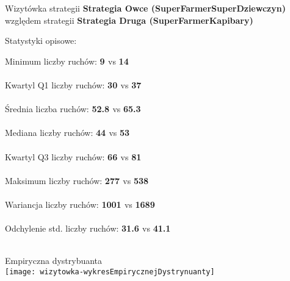 \documentclass{article}
\begin{document}
\thispagestyle{empty}

\begin{center}
{\large Wizytówka strategii {\color[HTML]{1D77A8} \textbf{ Strategia Owce (SuperFarmerSuperDziewczyn) }} względem strategii {\color[HTML]{999999} \textbf{ Strategia Druga (SuperFarmerKapibary) }}}\end{center}
\vspace*{3mm}
\begin{multicols}{3}

\begin{center}
{\large Statystyki opisowe:}
\end{center}
Minimum liczby ruchów: \hfill {\textbf {\color[HTML]{1D77A8} { \LARGE  9 }}} vs {\textbf {\color[HTML]{999999} { \Large  14 }}}\\\\Kwartyl Q1 liczby ruchów: \hfill {\textbf {\color[HTML]{1D77A8} { \LARGE  30 }}} vs {\textbf {\color[HTML]{999999} { \Large  37 }}}\\\\Średnia liczba ruchów: \hfill {\textbf {\color[HTML]{1D77A8} { \LARGE  52.8 }}} vs {\textbf {\color[HTML]{999999} { \Large  65.3 }}}\\\\Mediana liczby ruchów: \hfill {\textbf {\color[HTML]{1D77A8} { \LARGE  44 }}} vs {\textbf {\color[HTML]{999999} { \Large  53 }}}\\\\Kwartyl Q3 liczby ruchów: \hfill {\textbf {\color[HTML]{1D77A8} { \LARGE  66 }}} vs {\textbf {\color[HTML]{999999} { \Large  81 }}}\\\\Maksimum liczby ruchów: \hfill {\textbf {\color[HTML]{1D77A8} { \LARGE  277 }}} vs {\textbf {\color[HTML]{999999} { \Large  538 }}}\\\\Wariancja liczby ruchów: \hfill {\textbf {\color[HTML]{1D77A8} { \LARGE  1001 }}} vs {\textbf {\color[HTML]{999999} { \Large  1689 }}}\\\\Odchylenie std. liczby ruchów: \hfill {\textbf {\color[HTML]{1D77A8} { \LARGE  31.6 }}} vs {\textbf {\color[HTML]{999999} { \Large  41.1 }}}\\\\
\begin{center}
{\large Empiryczna dystrybuanta}\\

\texttt{[image: wizytowka-wykresEmpirycznejDystrynuanty]}
\end{center}


\end{multicols}
\end{document}
